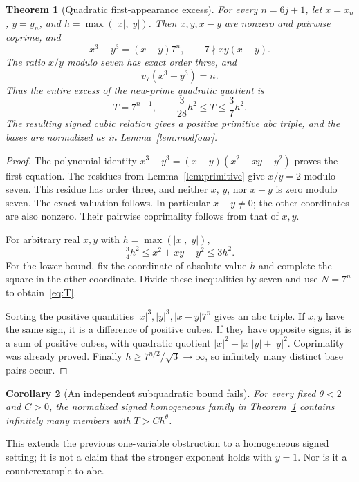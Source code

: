 \documentclass[11pt]{article}
\newtheorem{theorem}{Theorem}[section]
\newtheorem{corollary}[theorem]{Corollary}
\theoremstyle{definition}
\theoremstyle{remark}
\begin{document}
\begin{theorem}[Quadratic first-appearance excess]\label{thm:quadratic}
For every $n=6j+1$, let $x=x_n$, $y=y_n$, and $h=\max(|x|,|y|)$. Then $x,y,x-y$ are nonzero and pairwise coprime, and
\begin{equation}\label{eq:cubic}
x^3-y^3=(x-y)7^n,\qquad 7\nmid xy(x-y).
\end{equation}
The ratio $x/y$ modulo seven has exact order three, and
\[
v_7(x^3-y^3)=n.
\]
Thus the entire excess of the new-prime quadratic quotient is
\begin{equation}\label{eq:T}
T=7^{n-1},\qquad \frac{3}{28}h^2\le T\le\frac37h^2.
\end{equation}
The resulting signed cubic relation gives a positive primitive abc triple, and the bases are normalized as in Lemma~\ref{lem:modfour}.
\end{theorem}
\begin{proof}
The polynomial identity $x^3-y^3=(x-y)(x^2+xy+y^2)$ proves the first equation. The residues from Lemma~\ref{lem:primitive} give $x/y=2$ modulo seven. This residue has order three, and neither $x$, $y$, nor $x-y$ is zero modulo seven. The exact valuation follows. In particular $x-y\ne0$; the other coordinates are also nonzero. Their pairwise coprimality follows from that of $x,y$.

For arbitrary real $x,y$ with $h=\max(|x|,|y|)$,
\[
\tfrac34 h^2\le x^2+xy+y^2\le3h^2.
\]
For the lower bound, fix the coordinate of absolute value $h$ and complete the square in the other coordinate. Divide these inequalities by seven and use $N=7^n$ to obtain~\eqref{eq:T}.

Sorting the positive quantities $|x|^3,|y|^3,|x-y|7^n$ gives an abc triple. If $x,y$ have the same sign, it is a difference of positive cubes. If they have opposite signs, it is a sum of positive cubes, with quadratic quotient $|x|^2-|x||y|+|y|^2$. Coprimality was already proved. Finally $h\ge7^{n/2}/\sqrt3\to\infty$, so infinitely many distinct base pairs occur.
\end{proof}

\begin{corollary}[An independent subquadratic bound fails]
For every fixed $\theta<2$ and $C>0$, the normalized signed homogeneous family in Theorem~\ref{thm:quadratic} contains infinitely many members with $T>Ch^\theta$.
\end{corollary}
This extends the previous one-variable obstruction to a homogeneous signed setting; it is not a claim that the stronger exponent holds with $y=1$. Nor is it a counterexample to abc.
\end{document}
